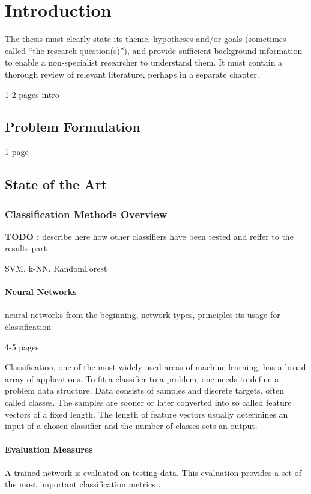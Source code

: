 \chapter{Introduction} \label{chapter:01:introduction}

The thesis must clearly state its theme, hypotheses and/or goals (sometimes called “the research question(s)”), and provide sufficient background information to enable a non-specialist researcher to understand them. It must contain a thorough review of relevant literature, perhaps in a separate chapter.

1-2 pages intro

\newpage
\section{Problem Formulation}
1 page

\newpage
\section{State of the Art} \label{sec:soa}

\subsection{Classification Methods Overview} \label{sec:soa_other_classifiers}
\textbf{TODO :} describe here how other classifiers have been tested and reffer to the results part

SVM, k-NN, RandomForest

\subsubsection*{Neural Networks} \label{ssec:intro_to_nn}

neural networks from the beginning, network types, principles its usage for classification

4-5 pages

Classification, one of the most widely used areas of machine learning, has a broad array of applications. To fit a classifier to a problem, one needs to define a problem data structure. Data consists of samples and discrete targets, often called classes. The samples are sooner or later converted into so called feature vectors of a fixed length. The length of feature vectors usually determines an input of a chosen classifier and the number of classes sets an output.

\subsubsection*{Evaluation Measures} \label{ssec:soa_evaluation_measures}
A trained network is evaluated on testing data. This evaluation provides a set of the most important classification metrics \citep{article:scikit-learn}.

